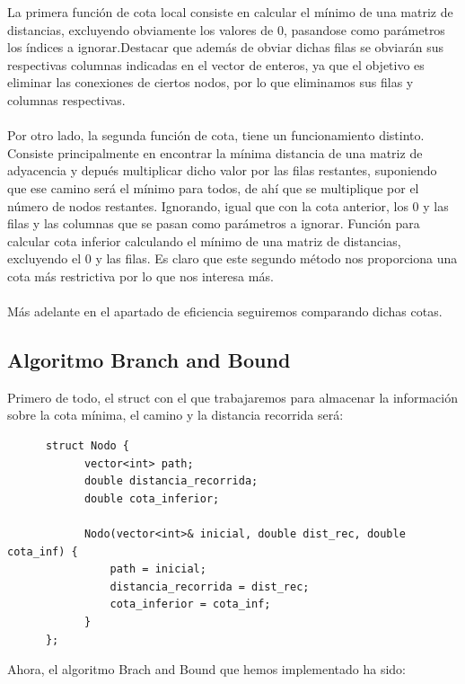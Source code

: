 \documentclass[11pt,openany]{book}
\begin{document}
La primera función de cota local consiste en calcular el mínimo de una matriz de distancias, excluyendo obviamente los valores
de 0, pasandose como parámetros los índices a ignorar.Destacar que además de obviar dichas filas se obviarán sus respectivas 
columnas indicadas en el vector de enteros, ya que el objetivo es eliminar las conexiones de ciertos nodos, por lo que 
eliminamos sus filas y columnas respectivas.
\\ \\
Por otro lado, la segunda función de cota, tiene un funcionamiento 
distinto. Consiste principalmente en encontrar la mínima distancia de una matriz de adyacencia y depués multiplicar dicho valor por
las filas restantes, suponiendo que ese camino será el mínimo para todos, de ahí que se multiplique por el número de nodos restantes.
Ignorando, igual que con la cota anterior, los 0 y las filas y las columnas que se pasan como parámetros a ignorar. Función para calcular 
cota inferior calculando el mínimo de una matriz de distancias, excluyendo el 0 y las filas. Es claro que este segundo método nos proporciona 
una cota más restrictiva por lo que nos interesa más.
\\ \\
Más adelante en el apartado de eficiencia seguiremos comparando dichas cotas.

\subsection{Algoritmo Branch and Bound}
Primero de todo, el struct con el que trabajaremos para almacenar la información sobre la cota mínima, el camino y la distancia recorrida será:

\begin{lstlisting}
      struct Nodo {
            vector<int> path;
            double distancia_recorrida; 
            double cota_inferior; 
        
            Nodo(vector<int>& inicial, double dist_rec, double cota_inf) {
                path = inicial;
                distancia_recorrida = dist_rec;
                cota_inferior = cota_inf;
            }
      };
\end{lstlisting}

Ahora, el algoritmo Brach and Bound que hemos implementado ha sido:
\end{document}
